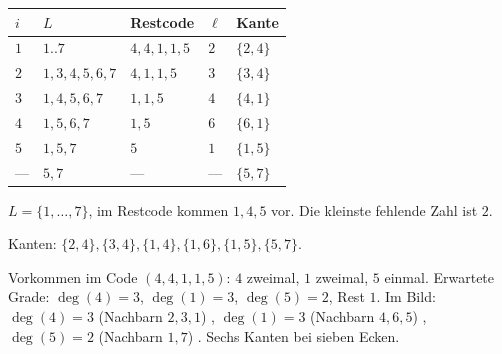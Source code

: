 \begin{aufgabe}
\begin{center}
{\small
\renewcommand{\arraystretch}{1.4}
\begin{tabular}{@{}P{0.8cm}P{2.4cm}P{1.8cm}P{1.2cm}P{1.4cm}@{}}
\toprule
$i$ & $L$ & \textbf{Restcode} & $\ell$ & \textbf{Kante}\\
\midrule
$1$ & $1..7$ & $4,4,1,1,5$ & $2$ & $\{2,4\}$\\
$2$ & $1,3,4,5,6,7$ & $4,1,1,5$ & $3$ & $\{3,4\}$\\
$3$ & $1,4,5,6,7$ & $1,1,5$ & $4$ & $\{4,1\}$\\
$4$ & $1,5,6,7$ & $1,5$ & $6$ & $\{6,1\}$\\
$5$ & $1,5,7$ & $5$ & $1$ & $\{1,5\}$\\
\midrule
--- & $5,7$ & --- & --- & $\{5,7\}$\\
\bottomrule
\end{tabular}}
\end{center}

$L = \{1,\ldots,7\}$, im Restcode kommen $1,4,5$ vor. Die kleinste fehlende Zahl ist $2$.

Kanten: $\{2,4\}, \{3,4\}, \{1,4\}, \{1,6\}, \{1,5\}, \{5,7\}$.

\begin{center}
\end{center}

Vorkommen im Code $(4,4,1,1,5)$: $4$ zweimal, $1$ zweimal, $5$ einmal. Erwartete Grade: $\deg(4) = 3$, $\deg(1) = 3$, $\deg(5) = 2$, Rest $1$.
Im Bild: $\deg(4) = 3$ (Nachbarn $2,3,1$) \checkmark, $\deg(1) = 3$ (Nachbarn $4,6,5$) \checkmark, $\deg(5) = 2$ (Nachbarn $1,7$) \checkmark. Sechs Kanten bei sieben Ecken. \checkmark
\end{aufgabe}

